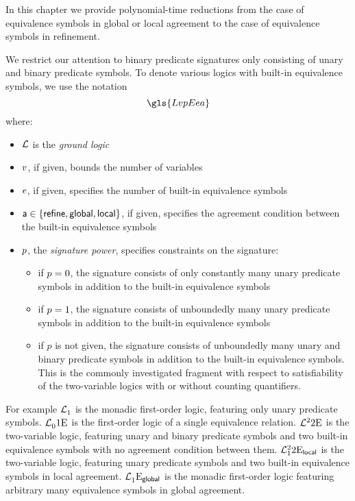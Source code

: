 In this chapter we provide polynomial-time reductions from the case of
equivalence symbols in global or local agreement to the case of equivalence
symbols in refinement.

We restrict our attention to binary predicate signatures only consisting of
unary and binary predicate symbols.
To denote various logics with built-in equivalence symbols, we use the notation
\[
  \gls{LvpEea}
\]
where:
\begin{itemize}
  \item $\mathcal{L}$ is the \emph{ground logic}
  \item $v$, if given, bounds the number of variables
  \item $e$, if given, specifies the number of built-in equivalence symbols
  \item $\mathsf{a} \in \left\{\mathsf{refine}, \mathsf{global}, \mathsf{local}\right\}$, if given, specifies the
  agreement condition between the built-in equivalence symbols
  \item $p$, the \emph{signature power}, specifies constraints on the
  signature:
  \begin{itemize}
    \item if $p = 0$, the signature consists of only constantly many unary
    predicate symbols in addition to the built-in equivalence symbols
    \item if $p = 1$, the signature consists of unboundedly many unary
    predicate symbols in addition to the built-in equivalence symbols
    \item if $p$ is not given, the signature consists of unboundedly many unary
    and binary predicate symbols in addition to the built-in equivalence symbols.
    This is the commonly investigated fragment with respect to satisfiability of
    the two-variable logics with or without counting quantifiers.
  \end{itemize}
\end{itemize}

For example $\mathcal{L}^{{}}_{1}$ is the monadic first-order logic, featuring only
unary predicate symbols.
$\mathcal{L}^{{}}_{0}{1}\mathrm{E}_{{}}$ is the first-order logic of a single equivalence
relation.
$\mathcal{L}^{2}_{{}}{2}\mathrm{E}_{{}}$ is the two-variable logic, featuring unary and binary
predicate symbols and two built-in equivalence symbols with no agreement
condition between them.
$\mathcal{L}^{2}_{1}{2}\mathrm{E}_{\mathsf{local}}$ is the two-variable logic,
featuring unary predicate symbols and two built-in equivalence symbols in local
agreement.
$\mathcal{L}^{{}}_{1}{{}}\mathrm{E}_{\mathsf{global}}$ is the monadic first-order logic featuring
arbitrary many equivalence symbols in global agreement.

